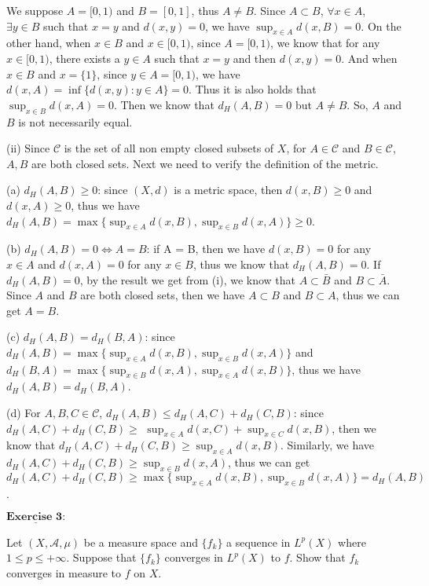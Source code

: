 \documentclass[12pt,a4paper]{ctexart}
\begin{document}
We suppose $A = [0, 1)$ and $B = [0, 1]$, thus $A \neq B$. Since $A \subset B$, $\forall x \in A$, $\exists y \in B$ such that $x = y$ and $d(x, y) = 0$, we have $\sup_{x \in A} d(x, B) = 0$. On the other hand, when $x \in B$ and $x \in [0, 1)$, since $A = [0, 1)$, we know that for any $x \in [0, 1)$, there exists a $y \in A$ such that $x = y$ and then $d(x, y) = 0$. And when $x \in B$ and $x = \{1\}$, since $y \in A = [0, 1)$, we have $d(x, A) = \inf \{d(x, y): y \in A \} = 0$. Thus it is also holds that $\sup_{x \in B} d(x, A) = 0$. Then we know that $d_{H}(A, B) = 0$ but $A \neq B$. So, $A$ and $B$ is not necessarily equal.

\vspace{8pt}

(ii) Since $\mathcal{C}$ is the set of all non empty closed subsets of $X$, for $A \in \mathcal{C}$ and $B \in \mathcal{C}$, $A, B$ are both closed sets. Next we need to verify the definition of the metric.

(a) $d_{H}(A, B) \geq 0$: since $(X, d)$ is a metric space, then $d(x, B) \geq 0$ and $d(x, A) \geq 0$, thus we have $d_{H}(A, B) = \max \{\sup_{x \in A} d(x, B), \sup_{x \in B} d(x, A) \} \geq 0$.

(b) $d_{H}(A, B) = 0 \iff A = B$: if A = B, then we have $d(x, B) = 0$ for any $x \in A$ and $d(x, A) = 0$ for any $x \in B$, thus we know that $d_{H}(A, B) = 0$. If $d_{H}(A, B) = 0$, by the result we get from (i), we know that $A \subset \bar{B}$ and $B \subset \bar{A}$. Since $A$ and $B$ are both closed sets, then we have $A \subset B$ and $B \subset A$, thus we can get $A = B$.

(c) $d_{H}(A, B) = d_{H}(B, A)$: since $d_{H}(A, B) = \max \{\sup_{x \in A} d(x, B), \sup_{x \in B} d(x, A) \}$ and $d_{H}(B, A) = \max \{\sup_{x \in B} d(x, A), \sup_{x \in A} d(x, B) \}$, thus we have $d_{H}(A, B) = d_{H}(B, A)$.

(d) For $A, B, C \in \mathcal{C}$, $d_{H}(A, B) \leq d_{H}(A, C) + d_{H}(C, B)$: since $d_{H}(A, C) + d_{H}(C, B) \geq $ $\sup_{x \in A} d(x, C) + \sup_{x \in C} d(x, B)$, then we know that $d_{H}(A, C) + d_{H}(C, B) \geq \sup_{x \in A} d(x, B)$. Similarly, we have $d_{H}(A, C) + d_{H}(C, B) \geq \sup_{x \in B} d(x, A)$, thus we can get $d_{H}(A, C) + d_{H}(C, B) \geq \max \{\sup_{x \in A} d(x, B), \sup_{x \in B} d(x, A) \} = d_{H}(A, B)$.

\newpage

$\underline{\textbf{Exercise 3:}}$

Let $(X, \mathcal{A}, \mu)$ be a measure space and $\{f_{k}\}$ a sequence in $L^{p}(X)$ where $1 \leq p \leq + \infty$. Suppose that $\{f_{k}\}$ converges in $L^{p}(X)$ to $f$. Show that $f_{k}$ converges in measure to $f$ on $X$.
\end{document}
